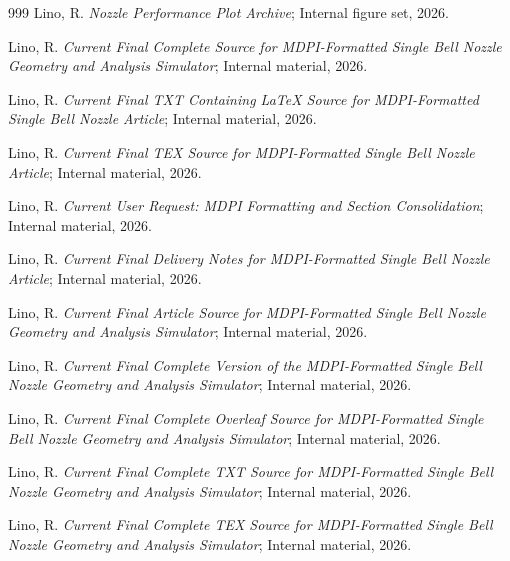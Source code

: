 \documentclass[journal,article,submit,oneauthor]{Definitions/mdpi}
\begin{document}
\begin{thebibliography}{999}
Lino, R. \textit{Nozzle Performance Plot Archive}; Internal figure set, 2026.

Lino, R. \textit{Current Final Complete Source for MDPI-Formatted Single Bell Nozzle Geometry and Analysis Simulator}; Internal material, 2026.

Lino, R. \textit{Current Final TXT Containing LaTeX Source for MDPI-Formatted Single Bell Nozzle Article}; Internal material, 2026.

Lino, R. \textit{Current Final TEX Source for MDPI-Formatted Single Bell Nozzle Article}; Internal material, 2026.

Lino, R. \textit{Current User Request: MDPI Formatting and Section Consolidation}; Internal material, 2026.

Lino, R. \textit{Current Final Delivery Notes for MDPI-Formatted Single Bell Nozzle Article}; Internal material, 2026.

Lino, R. \textit{Current Final Article Source for MDPI-Formatted Single Bell Nozzle Geometry and Analysis Simulator}; Internal material, 2026.

Lino, R. \textit{Current Final Complete Version of the MDPI-Formatted Single Bell Nozzle Geometry and Analysis Simulator}; Internal material, 2026.

Lino, R. \textit{Current Final Complete Overleaf Source for MDPI-Formatted Single Bell Nozzle Geometry and Analysis Simulator}; Internal material, 2026.

Lino, R. \textit{Current Final Complete TXT Source for MDPI-Formatted Single Bell Nozzle Geometry and Analysis Simulator}; Internal material, 2026.

Lino, R. \textit{Current Final Complete TEX Source for MDPI-Formatted Single Bell Nozzle Geometry and Analysis Simulator}; Internal material, 2026.

\end{thebibliography}

\PublishersNote{}
\end{document}
